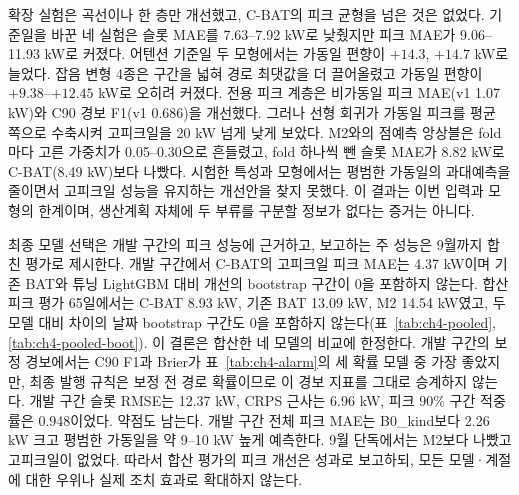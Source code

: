 확장 실험은 곡선이나 한 층만 개선했고, C-BAT의 피크 균형을 넘은 것은 없었다. 기준일을 바꾼 네 실험은 슬롯 MAE를 7.63--7.92 kW로 낮췄지만 피크 MAE가 9.06--11.93 kW로 커졌다. 어텐션 기준일 두 모형에서는 가동일 편향이 $+14.3$, $+14.7$ kW로 늘었다. 잡음 변형 4종은 구간을 넓혀 경로 최댓값을 더 끌어올렸고 가동일 편향이 $+9.38$--$+12.45$ kW로 오히려 커졌다. 전용 피크 계층은 비가동일 피크 MAE(v1 1.07 kW)와 C90 경보 F1(v1 0.686)을 개선했다. 그러나 선형 회귀가 가동일 피크를 평균 쪽으로 수축시켜 고피크일을 20 kW 넘게 낮게 보았다. M2와의 점예측 앙상블은 fold마다 고른 가중치가 0.05--0.30으로 흔들렸고, fold 하나씩 뺀 슬롯 MAE가 8.82 kW로 C-BAT(8.49 kW)보다 나빴다. 시험한 특성과 모형에서는 평범한 가동일의 과대예측을 줄이면서 고피크일 성능을 유지하는 개선안을 찾지 못했다. 이 결과는 이번 입력과 모형의 한계이며, 생산계획 자체에 두 부류를 구분할 정보가 없다는 증거는 아니다.

최종 모델 선택은 개발 구간의 피크 성능에 근거하고, 보고하는 주 성능은 9월까지 합친 평가로 제시한다. 개발 구간에서 C-BAT의 고피크일 피크 MAE는 4.37 kW이며 기존 BAT와 튜닝 LightGBM 대비 개선의 bootstrap 구간이 0을 포함하지 않는다. 합산 피크 평가 65일에서는 C-BAT 8.93 kW, 기존 BAT 13.09 kW, M2 14.54 kW였고, 두 모델 대비 차이의 날짜 bootstrap 구간도 0을 포함하지 않는다(표~\ref{tab:ch4-pooled}, \ref{tab:ch4-pooled-boot}). 이 결론은 합산한 네 모델의 비교에 한정한다. 개발 구간의 보정 경보에서는 C90 F1과 Brier가 표~\ref{tab:ch4-alarm}의 세 확률 모델 중 가장 좋았지만, 최종 발행 규칙은 보정 전 경로 확률이므로 이 경보 지표를 그대로 승계하지 않는다. 개발 구간 슬롯 RMSE는 12.37 kW, CRPS 근사는 6.96 kW, 피크 90\% 구간 적중률은 0.948이었다. 약점도 남는다. 개발 구간 전체 피크 MAE는 B0\_kind보다 2.26 kW 크고 평범한 가동일을 약 9--10 kW 높게 예측한다. 9월 단독에서는 M2보다 나빴고 고피크일이 없었다. 따라서 합산 평가의 피크 개선은 성과로 보고하되, 모든 모델·계절에 대한 우위나 실제 조치 효과로 확대하지 않는다.
